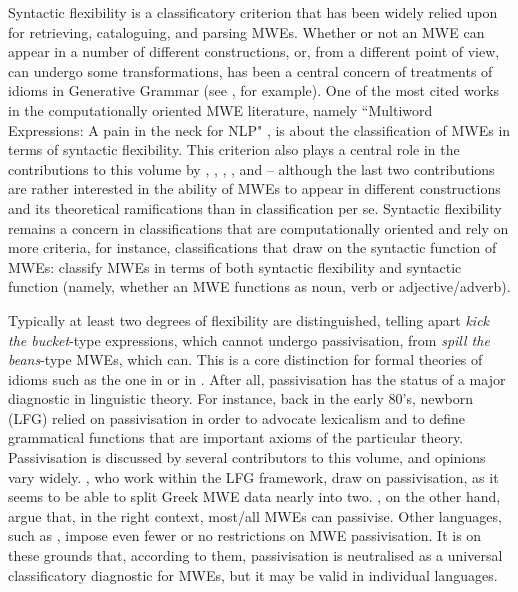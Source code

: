 \documentclass[output=paper]{langsci/langscibook}
\begin{document}
Syntactic flexibility  is a classificatory criterion that has been widely relied upon for retrieving, cataloguing, and parsing MWEs. Whether or not an MWE can appear in a number of different constructions, or, from a different point of view, can undergo some transformations, has been a central concern of treatments of idioms in Generative Grammar (see \citealt{Fraser1970}, for example). One of the most cited works in the computationally oriented MWE literature, namely ``Multiword Expressions: A pain in the neck for NLP" \citep{Sag:2002}, is about the classification of MWEs in terms of syntactic flexibility. This criterion also plays a central role in the contributions to this volume by \citeauthor{Kuiper2018tv}, \citeauthor{Laporte2018tv},
\citeauthor{ParraEtal2018tv}, \citeauthor{BargmannSailer2018tv}, and
\citeauthor{MarkantonatouSamaridi2018tv}
-- although the last two contributions are rather interested in the ability of MWEs to appear in different constructions and its theoretical ramifications than in classification per se. Syntactic flexibility remains a concern in classifications that are computationally oriented and rely on more criteria, for instance, classifications that draw on the syntactic function of MWEs: 
 classify MWEs in terms of both syntactic flexibility and syntactic function (namely, whether an MWE functions as  noun, verb or adjective/adverb). 

Typically at least two degrees of flexibility  are distinguished, telling apart \textit{kick the bucket}-type expressions, which cannot undergo   passivisation, from \textit{spill the beans}-type MWEs, which can. This is a core distinction for formal theories of idioms such as the one in   \citep{GKPS} or in \citet{Nunberg1994}. After all, passivisation has the status of a major diagnostic in linguistic theory. For instance, back in the early 80's, newborn   (LFG) relied on passivisation in order to advocate lexicalism  and to define grammatical functions that are important axioms of the particular theory. Passivisation is discussed by several contributors to this volume, and opinions vary widely.  , who work within the LFG framework, draw on passivisation, as it seems to be able to split Greek MWE data nearly into two.  , on the other hand,
argue that, in the right context, most/all  MWEs can passivise. Other languages, such as , impose even fewer or no restrictions on MWE passivisation. It is on these grounds that, according to them, passivisation is neutralised as a universal classificatory diagnostic for MWEs, but it may be valid in individual languages.
\end{document}

